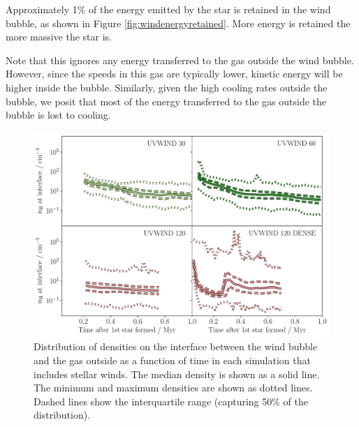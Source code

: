\documentclass[a4paper,fleqn,usenatbib]{mnras}
\begin{document}
Approximately 1\% of the energy emitted by the star is retained in the wind bubble, as shown in Figure \ref{fig:windenergyretained}. More energy is retained the more massive the star is. 

Note that this ignores any energy transferred to the gas outside the wind bubble. However, since the speeds in this gas are typically lower, kinetic energy will be higher inside the bubble. Similarly, given the high cooling rates outside the bubble, we posit that most of the energy transferred to the gas outside the bubble is lost to cooling.

\begin{figure}
	\includegraphics[width=1.98\columnwidth]{plots/fig8a.pdf}
	\caption{Distribution of densities on the interface between the wind bubble and the gas outside as a function of time in each simulation that includes stellar winds. The median density is shown as a solid line. The minimum and maximum densities are shown as dotted lines. Dashed lines show the interquartile range (capturing 50\% of the distribution).}
	\label{fig:findHIIdensities}
\end{figure}
\end{document}
